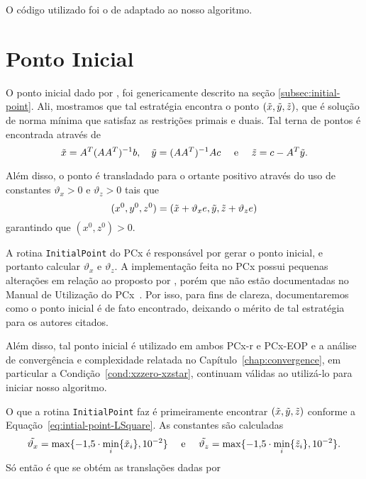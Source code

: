 O código utilizado foi o de \textcite{VillasBoas:2012ur,VillasBoas2013:wn} adaptado ao nosso algoritmo. 




\section{Ponto Inicial}

O ponto inicial dado por \textcite{Mehrotra:1992wr}, foi genericamente descrito na seção \ref{subsec:initial-point}. Ali, mostramos que tal estratégia encontra o ponto $(\tilde{x},\tilde{y},\tilde{z})$, que é solução de norma mínima que satisfaz as restrições primais e
duais. Tal terna de pontos é encontrada através de
\begin{equation}
	\label{eq:intial-point-LSquare}
	\tilde{x} = A^T(AA^T)^{-1}b, \quad \tilde{y} = (AA^T)^{-1}Ac\quad \text{ e }
\quad \tilde{z} = c - A^T\tilde{y}.
\end{equation}

Além disso, o ponto é transladado para o ortante positivo 
através do uso de constantes  $\vartheta_x>0$ e $\vartheta_ z>0$ tais que  
\begin{equation}
	\label{eq:intial-point-generated}
(x^0,y^0,z^0) = (\tilde{x}+ \vartheta_x e,\tilde{y},\tilde{z}+\vartheta_z e)
\end{equation}
garantindo que $(x^0,z^0)>0$.


 A rotina \verb|InitialPoint| do PCx é responsável por gerar o ponto inicial, e portanto calcular  $\vartheta_x$ e $\vartheta_ z$. A implementação feita no PCx possui  pequenas alterações em relação ao proposto por \citeauthor{Mehrotra:1992wr}, porém que não  estão documentadas no Manual de Utilização do PCx~\cite{Czyzyk:1998vw}. Por isso, para fins de clareza, documentaremos como o ponto inicial é de fato encontrado, deixando o mérito de tal estratégia para os autores citados.

  Além disso, tal ponto inicial é utilizado em ambos PCx-r e PCx-EOP e a análise de convergência e complexidade relatada no Capítulo~\ref{chap:convergence}, em particular a Condição~\ref{cond:xzzero-xzstar}, continuam válidas ao utilizá-lo para iniciar nosso algoritmo.

O que a rotina  \verb|InitialPoint| faz é primeiramente encontrar  $(\tilde{x},\tilde{y},\tilde{z})$ conforme a Equação~\eqref{eq:intial-point-LSquare}. As constantes são calculadas
\begin{equation}
	\label{eq:initial-point-tilde-var}
\tilde{\vartheta_x} = \max\{\displaystyle\num{-1.5}\cdot\min_{i}\{\tilde{x}_{i}\},\num{e-2}\} \quad \text{ e }\quad  \tilde{\vartheta_z} = \max\{\displaystyle\num{-1.5}\cdot\min_{i}\{\tilde{z}_{i}\},\num{e-2}\}.
\end{equation}
Só então é que se obtém as translações dadas por 

